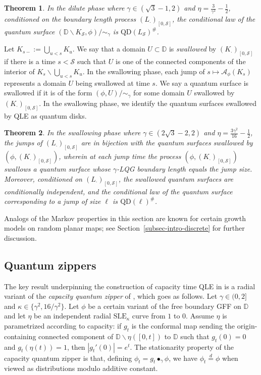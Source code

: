 \documentclass[a4paper]{article}
\numberwithin{equation}{section}
\newcommand{\D}{\mathbb{D}}
\newcommand{\cA}{\mathcal{A}}
\newcommand{\qduration}{\mathcal{S}}
\newcommand{\QD}{\mathrm{QD}}
\newcommand{\SLE}{\mathrm{SLE}}
\newtheorem{theorem}{Theorem}[section]
\theoremstyle{remark}
\numberwithin{equation}{section}
\begin{document}
\begin{theorem}\label{thm-simple-markov}
    In the dilute phase where $\gamma \in (\sqrt3 - 1,2)$ and $\eta = \frac3{\gamma^2} - \frac12$, conditioned on the boundary length process $(L_\cdot)_{[0,\qduration]}$, the conditional law of the quantum surface $(\D \backslash K_\qduration, \phi)/{\sim_\gamma}$ is $\QD(L_\qduration)^\#$.
\end{theorem}


Let $K_{s-} := \bigcup_{u < s} K_u$. 
We say that a domain $U \subset \D$ is \emph{swallowed} by $(K_\cdot)_{[0,\qduration]}$ if there is a time $s< \qduration$ such that $U$ is one of the connected components of the interior of $K_s \backslash \bigcup_{u < s} K_u$. In the swallowing phase, each jump of $s \mapsto \cA_\phi(K_s)$ represents a domain $U$ being swallowed at time $s$. 
We say a quantum surface is swallowed if it is of the form $(\phi, U)/{\sim_\gamma}$ for some domain $U$ swallowed by $(K_\cdot)_{[0,\qduration]}$. In the swallowing phase, we identify the quantum surfaces swallowed by QLE as quantum disks. 

\begin{theorem}\label{thm-swallowing-markov}
    In the swallowing phase where $\gamma \in (2\sqrt3-2,2)$ and $\eta = \frac{3\gamma^2}{16} - \frac12$, the jumps of $(L_\cdot)_{[0,\qduration]}$ are in bijection with the quantum surfaces swallowed by $(\phi, (K_\cdot)_{[0,\qduration]})$, wherein at each jump time the process $(\phi, (K_\cdot)_{[0,\qduration]})$ swallows a quantum surface whose $\gamma$-LQG boundary length equals the jump size. Moreover, conditioned on $(L_{\cdot})_{[0,\qduration]}$, the swallowed quantum surfaces are conditionally independent, and the conditional law of the quantum surface corresponding to a jump of size $\ell$ is $\QD(\ell)^\#$. 
\end{theorem}

Analogs of the Markov properties in this section are known for certain growth models on random planar maps; see Section~\ref{subsec-intro-discrete} for further discussion.


\subsection{Quantum zippers}\label{subsec-intro-continuum}
The key result underpinning the construction of capacity time QLE in \cite{ms-qle} is a radial variant of the \emph{capacity quantum zipper} of \cite[Corollary 1.5]{shef-zipper}, which goes as follows. Let $\gamma \in (0,2]$ and $\kappa \in \{ \gamma^2, 16/\gamma^2\}$. Let $\phi$ be a certain variant of the free boundary GFF on $\D$ and let $\eta$ be an independent radial $\SLE_\kappa$ curve from $1$ to $0$. Assume $\eta$ is  parametrized according to capacity: if $g_t$ is the conformal map sending the origin-containing connected component of $\D \backslash \eta([0,t])$ to $\D$ such that $g_t(0) = 0$ and $g_t(\eta(t)) = 1$, then $|g_t'(0)| = e^{t}$. The stationarity property of the capacity quantum zipper is that, defining $\phi_t = g_t \bullet_\gamma \phi$, we have $\phi_t \stackrel d= \phi$ when viewed as distributions modulo additive constant. 
\end{document}
